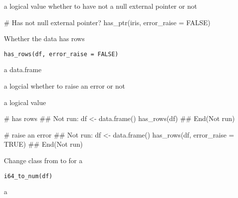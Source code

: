 \documentclass[letterpaper]{book}
\begin{document}
%
\begin{Value}
a logical value whether to have not a null external pointer or not
\end{Value}
%
\begin{Examples}
\begin{ExampleCode}
# Has not null external pointer?
has_ptr(iris, error_raise = FALSE)

\end{ExampleCode}
\end{Examples}
%
\begin{Description}
Whether the data has rows
\end{Description}
%
\begin{Usage}
\begin{verbatim}
has_rows(df, error_raise = FALSE)
\end{verbatim}
\end{Usage}
%
\begin{Arguments}
\begin{ldescription}
\item[\code{df}] a data.frame

\item[\code{error\_raise}] a logcial whether to raise an error or not
\end{ldescription}
\end{Arguments}
%
\begin{Value}
a logical value
\end{Value}
%
\begin{Examples}
\begin{ExampleCode}
# has rows
## Not run: 
df <- data.frame()
has_rows(df)
## End(Not run)

# raise an error
## Not run: 
df <- data.frame()
has_rows(df, error_raise = TRUE)
## End(Not run)

\end{ExampleCode}
\end{Examples}
%
\begin{Description}
Change class from  to  for a 
\end{Description}
%
\begin{Usage}
\begin{verbatim}
i64_to_num(df)
\end{verbatim}
\end{Usage}
%
\begin{Arguments}
\begin{ldescription}
\item[\code{df}] a 
\end{ldescription}
\end{Arguments}
\end{document}
